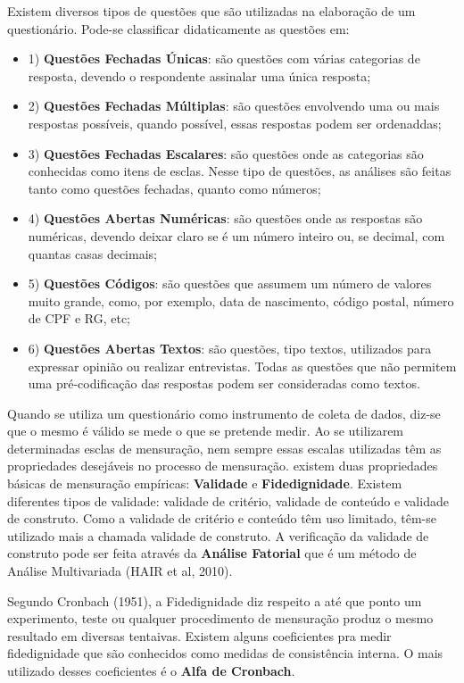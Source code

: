 \inic Existem diversos tipos de questões que são utilizadas na elaboração de um questionário. Pode-se classificar didaticamente as questões em:


\begin{itemize}
\item{1)} \textbf{Questões Fechadas Únicas}: são questões com várias categorias de resposta, devendo o respondente assinalar uma única resposta;
\item{2)} \textbf{Questões Fechadas Múltiplas}: são questões envolvendo uma ou mais respostas possíveis, quando possível, essas respostas podem ser ordenaddas;
\item{3)} \textbf{ Questões Fechadas Escalares}: são questões onde  as categorias são conhecidas como itens de esclas. Nesse tipo de questões, as análises são feitas tanto como questões fechadas, quanto como números;
\item{4)} \textbf{ Questões Abertas Numéricas}: são questões onde as respostas são numéricas, devendo deixar claro se é um número inteiro ou, se decimal, com quantas casas decimais;
\item{5)} \textbf{ Questões Códigos}: são questões que assumem  um número de valores muito grande, como, por exemplo, data de nascimento, código postal, número de CPF e RG, etc;
\item{6)} \textbf{ Questões Abertas Textos}: são questões, tipo textos, utilizados para expressar opinião ou realizar entrevistas. Todas as questões que não permitem uma pré-codificação das respostas podem ser consideradas como textos.
\end{itemize}


\newpage
\inic Quando se utiliza um questionário como instrumento de coleta de dados, diz-se que o mesmo é válido se mede o que se pretende medir. Ao se utilizarem determinadas esclas de mensuração, nem sempre essas escalas utilizadas têm as propriedades desejáveis no processo de mensuração. existem duas propriedades básicas de mensuração empíricas: \textbf{Validade} e \textbf{Fidedignidade}. Existem diferentes tipos de validade: validade de critério, validade de conteúdo e validade de construto. Como a validade de critério e conteúdo têm uso limitado, têm-se utilizado mais a chamada validade de construto. A verificação da validade de construto pode ser feita através da \textbf{Análise Fatorial} que é um método de Análise Multivariada (HAIR et al, 2010).\vskip0.3cm

\inic Segundo Cronbach (1951), a Fidedignidade diz respeito a até que ponto um experimento, teste ou qualquer procedimento de mensuração produz o mesmo resultado em diversas tentaivas. Existem alguns coeficientes pra medir fidedignidade que são conhecidos como medidas de consistência interna. O mais utilizado desses coeficientes é o \textbf{Alfa de Cronbach}.  \vskip0.3cm

